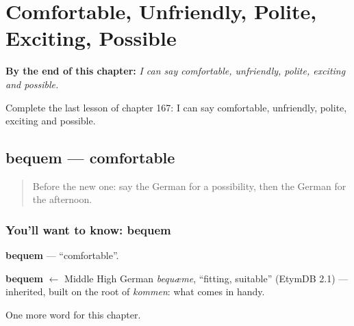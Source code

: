 
\chapter{Comfortable, Unfriendly, Polite, Exciting, Possible}
\label{ch:ge-comfortable-unfriendly-polite-exciting-possible}

\begin{chapteropening}
\textbf{By the end of this chapter:} \emph{I can say comfortable, unfriendly, polite, exciting and possible.}

Complete the last lesson of chapter 167: I can say comfortable, unfriendly, polite, exciting and possible.
\end{chapteropening}

\section[bequem]{bequem — comfortable}

\label{lesson:GE-C167-bequem}



\begin{quote}
Before the new one: say the German for a possibility, then the German for the afternoon.
\end{quote}

\subsection*{You'll want to know: bequem}
\textbf{bequem} — \textquotedblleft{}comfortable\textquotedblright{}.

\begin{cousinweb}
\textbf{bequem} $\leftarrow$ Middle High German \emph{bequæme}, \textquotedblleft{}fitting, suitable\textquotedblright{} (EtymDB 2.1) — inherited, built on the root of \emph{kommen}: what comes in handy.
\end{cousinweb}

\begin{grammarlens}[title={What you've built}]
One more word for this chapter.
\end{grammarlens}

